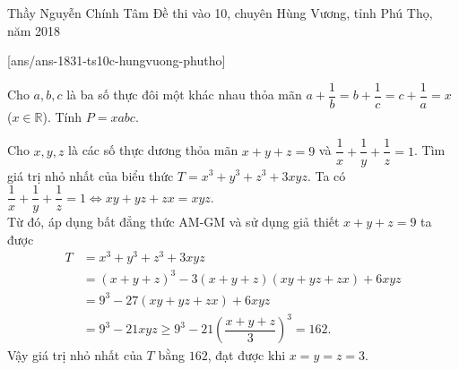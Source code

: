 \begin{name}
{Thầy Nguyễn Chính Tâm}
{Đề thi vào 10, chuyên Hùng Vương, tỉnh Phú Thọ, năm 2018}
\end{name}
\setcounter{ex}{0}
[ans/ans-1831-ts10c-hungvuong-phutho]
\begin{ex}%
Cho $a,b,c$ là ba số thực đôi một khác nhau thỏa mãn $a+\dfrac{1}{b}=b+\dfrac{1}{c}=c+\dfrac{1}{a}=x$ ($x\in\mathbb{R}$). Tính $P=xabc$.
\end{ex}

\begin{ex}%
Cho $x,y,z$ là các số thực dương thỏa mãn $x+y+z=9$ và $\dfrac{1}{x}+\dfrac{1}{y}+\dfrac{1}{z}=1$. Tìm giá trị nhỏ nhất của biểu thức $T=x^3+y^3+z^3+3xyz$.
\loigiai
    {
Ta có $\dfrac{1}{x}+\dfrac{1}{y}+\dfrac{1}{z}=1\Leftrightarrow xy+yz+zx=xyz$.\\
Từ đó, áp dụng bất đẳng thức AM-GM và sử dụng giả thiết $x+y+z=9$ ta được
\begin{align*}
T&=x^3+y^3+z^3+3xyz\\ 
&=(x+y+z)^3-3(x+y+z)(xy+yz+zx)+6xyz\\
&=9^3-27(xy+yz+zx)+6xyz\\
&=9^3-21xyz\ge 9^3-21\left(\dfrac{x+y+z}{3}\right)^3=162.
\end{align*}
Vậy giá trị nhỏ nhất của $T$ bằng $162$, đạt được khi $x=y=z=3$.
    }
\end{ex}

